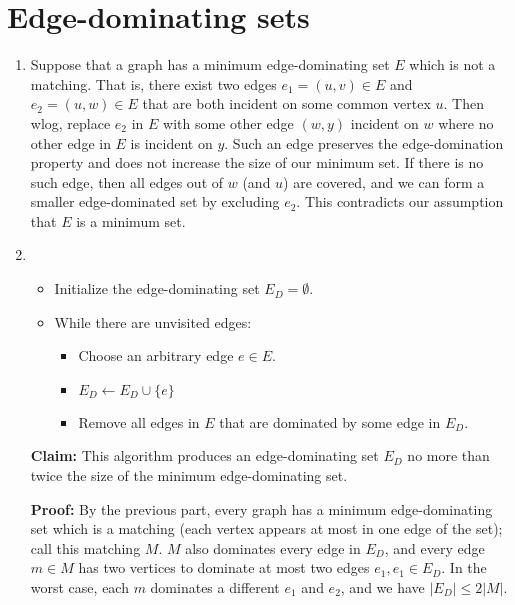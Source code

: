 \documentclass[12pt]{article}
\begin{document}
\section{Edge-dominating sets}
\begin{enumerate}
\item %
Suppose that a graph has a minimum edge-dominating set $E$ which is not a
matching. That is, there exist two edges $e_1 = (u,v) \in E$ and
$e_2 = (u,w) \in E$ that are both incident on some common vertex $u$.
Then wlog, replace $e_2$ in $E$ with some other edge $(w,y)$ incident on $w$
where no other edge in $E$ is incident on $y$. Such an edge preserves the
edge-domination property and does not increase the size of our minimum set.
If there is no such edge,
then all edges out of $w$ (and $u$) are covered, and we can form a smaller
edge-dominated set by excluding $e_2$. This contradicts our assumption
that $E$ is a minimum set.

\item %

\begin{itemize}
\item Initialize the edge-dominating set $E_D = \emptyset$.
\item While there are unvisited edges:
\begin{itemize}
\item Choose an arbitrary edge $e \in E$.
\item $E_D \gets E_D \cup \{e\}$
\item Remove all edges in $E$ that are dominated by some edge in $E_D$.
\end{itemize}
\end{itemize}

\textbf{Claim:} This algorithm produces an edge-dominating set $E_D$
no more than
twice the size of the minimum edge-dominating set.

\textbf{Proof:} By the previous part, every graph has a minimum edge-dominating
set which is a matching (each vertex appears at most in one edge of the set);
call this matching $M$. $M$ also dominates every edge in $E_D$, and every
edge $m \in M$ has two vertices to dominate at most two edges
$e_1,e_1 \in E_D$.
In the worst case, each $m$ dominates a different $e_1$ and $e_2$, and
we have $|E_D| \le 2 |M|$.

\end{enumerate}
\pagebreak
\end{document}
